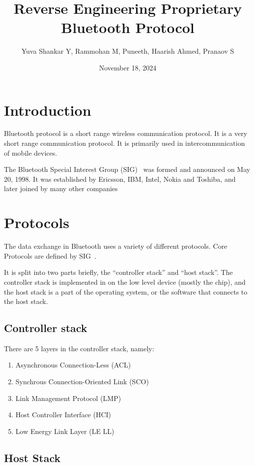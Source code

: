 \documentclass{article}
\title{Reverse Engineering Proprietary Bluetooth Protocol}
\author{Yuva Shankar Y, Rammohan M, Puneeth, Haarish Ahmed, Pranaov S}
\date{November 18, 2024}
\theoremstyle{mytheoremstyle}
\theoremstyle{mytheoremstyle}
\theoremstyle{myproblemstyle}
\begin{document}
\maketitle
\tableofcontents
\newpage


\section{Introduction}

Bluetooth protocol is a short range wireless communication protocol.
It is a very short range communication protocol.
It is primarily used in intercommunication of mobile devices.

The Bluetooth Special Interest Group (SIG)\cite{bt-sig}~\cite{bt-about} was formed and announced on May 20, 1998.
It was established by Ericsson, IBM, Intel, Nokia and Toshiba, and later joined by many other companies


\section{Protocols}

The data exchange in Bluetooth uses a variety of different protocols.
Core Protocols are defined by SIG~\cite{bt-about}\cite{bt-sig}.

It is split into two parts briefly, the ``controller stack'' and ``host stack''.
The controller stack is implemented in on the low level device (mostly the chip), and the host stack is a part of the operating system, or the software that connects to the host stack.

\subsection{Controller stack}

There are 5 layers in the controller stack, namely:

\begin{enumerate}
  \item Asynchronous Connection-Less (ACL)
  \item Synchrous Connection-Oriented Link (SCO)
  \item Link Management Protocol (LMP)
  \item Host Controller Interface (HCI)
  \item Low Energy Link Layer (LE LL)
\end{enumerate}

\subsection{Host Stack}
\end{document}
